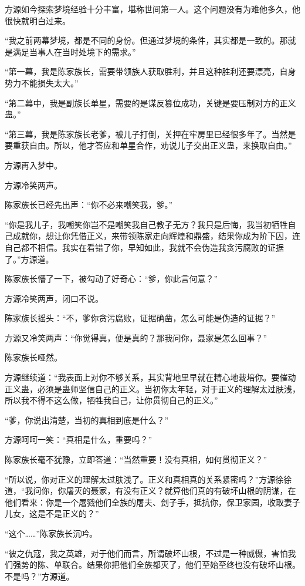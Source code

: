 \begin{this_body}
方源如今探索梦境经验十分丰富，堪称世间第一人。这个问题没有为难他多久，他很快就明白过来。

“我之前两幕梦境，都是不同的身份。但通过梦境的条件，其实都是一致的。那就是满足当事人在当时处境下的需求。”

“第一幕，我是陈家族长，需要带领族人获取胜利，并且这种胜利还要漂亮，自身势力不能损失太大。”

“第二幕中，我是副族长单星，需要的是谋反篡位成功，关键是要压制对方的正义蛊。”

“第三幕，我是陈家族长老爹，被儿子打倒，关押在牢房里已经很多年了。当然是要重获自由。所以，他才答应和单星合作，劝说儿子交出正义蛊，来换取自由。”

方源再入梦中。

方源冷笑两声。

陈家族长已经先出声：“你不必来嘲笑我，爹。”

“你是我儿子，我嘲笑你岂不是嘲笑我自己教子无方？我只是后悔，我当初牺牲自己成就你，想让你凭借正义，来带领陈家走向辉煌和鼎盛，结果你成为阶下囚，连自己都不相信。我实在看错了你，早知如此，我就不会伪造我贪污腐败的证据了。”方源道。

陈家族长懵了一下，被勾动了好奇心：“爹，你此言何意？”

方源冷笑两声，闭口不说。

陈家族长摇头：“不，爹你贪污腐败，证据确凿，怎么可能是伪造的证据？”

方源又冷笑两声：“你觉得真，便是真的？那我问你，聂家是怎么回事？”

陈家族长哑然。

方源继续道：“我表面上对你不够关系，其实背地里早就在精心地栽培你。要催动正义蛊，必须是蛊师坚信自己的正义。当初你太年轻，对于正义的理解太过肤浅，所以我不得不这么做，牺牲我自己，让你贯彻自己的正义。”

“爹，你说出清楚，当初的真相到底是什么？”

方源呵呵一笑：“真相是什么，重要吗？”

陈家族长毫不犹豫，立即答道：“当然重要！没有真相，如何贯彻正义？”

“所以说，你对正义的理解太过肤浅了。正义和真相真的关系紧密吗？”方源徐徐道，“我问你，你屠灭的聂家，有没有正义？就算他们真的有破坏山根的阴谋，在他们看来：你是一个屠戮他们全族的屠夫、刽子手，抵抗你，保卫家园，收取妻子儿女，这是不是正义的？”

“这个……”陈家族长沉吟。

“彼之仇寇，我之英雄，对于他们而言，所谓破坏山根，不过是一种威慑，害怕我们强势的陈、单联合。结果你把他们全族都灭了，他们至始至终也没有破坏山根。不是吗？”方源道。


\end{this_body}
